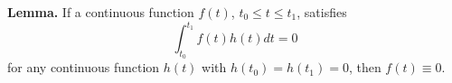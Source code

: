 \textbf{Lemma.} If a continuous function $f(t)$, $t_0 \leq t \leq t_1$, satisfies
$$\int_{t_0}^{t_1} f(t) h(t) dt = 0$$
for any continuous function $h(t)$ with $h(t_0) = h(t_1) = 0$, then $f(t) \equiv 0$.
